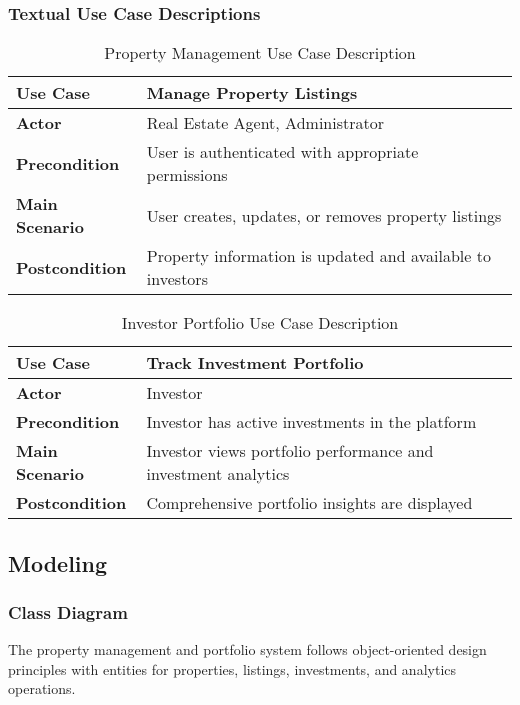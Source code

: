 \subsubsection{Textual Use Case Descriptions}

\begin{table}[htbp]
    \centering
    \begin{tabular}{|p{3cm}|p{10cm}|}
        \hline
        \textbf{Use Case} & \textbf{Manage Property Listings} \\
        \hline
        \textbf{Actor} & Real Estate Agent, Administrator \\
        \hline
        \textbf{Precondition} & User is authenticated with appropriate permissions \\
        \hline
        \textbf{Main Scenario} & User creates, updates, or removes property listings \\
        \hline
        \textbf{Postcondition} & Property information is updated and available to investors \\
        \hline
    \end{tabular}
    \caption{Property Management Use Case Description}
    \label{tab:property-management-use-case}
\end{table}

\begin{table}[htbp]
    \centering
    \begin{tabular}{|p{3cm}|p{10cm}|}
        \hline
        \textbf{Use Case} & \textbf{Track Investment Portfolio} \\
        \hline
        \textbf{Actor} & Investor \\
        \hline
        \textbf{Precondition} & Investor has active investments in the platform \\
        \hline
        \textbf{Main Scenario} & Investor views portfolio performance and investment analytics \\
        \hline
        \textbf{Postcondition} & Comprehensive portfolio insights are displayed \\
        \hline
    \end{tabular}
    \caption{Investor Portfolio Use Case Description}
    \label{tab:investor-portfolio-use-case}
\end{table}

\subsection{Modeling}
\subsubsection{Class Diagram}
The property management and portfolio system follows object-oriented design principles with entities for properties, listings, investments, and analytics operations.

